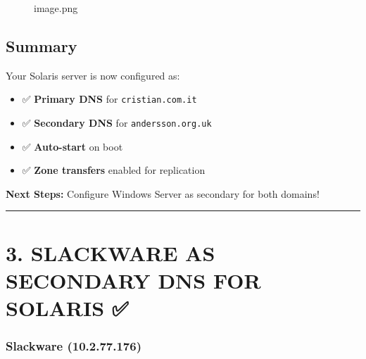 \begin{figure}
\centering
{}
\caption{image.png}
\end{figure}

\subsection{Summary}\label{summary}

Your Solaris server is now configured as:

\begin{itemize}
\tightlist
\item
  ✅ \textbf{Primary DNS} for \texttt{cristian.com.it}
\item
  ✅ \textbf{Secondary DNS} for \texttt{andersson.org.uk}
\item
  ✅ \textbf{Auto-start} on boot
\item
  ✅ \textbf{Zone transfers} enabled for replication
\end{itemize}

\textbf{Next Steps:} Configure Windows Server as secondary for both
domains!

\begin{center}\rule{0.5\linewidth}{0.5pt}\end{center}

\section{3. SLACKWARE AS SECONDARY DNS FOR SOLARIS
✅}\label{slackware-as-secondary-dns-for-solaris}

\subsubsection{\texorpdfstring{\textbf{Slackware
(10.2.77.176)}}{Slackware (10.2.77.176)}}\label{slackware-10.2.77.176}

